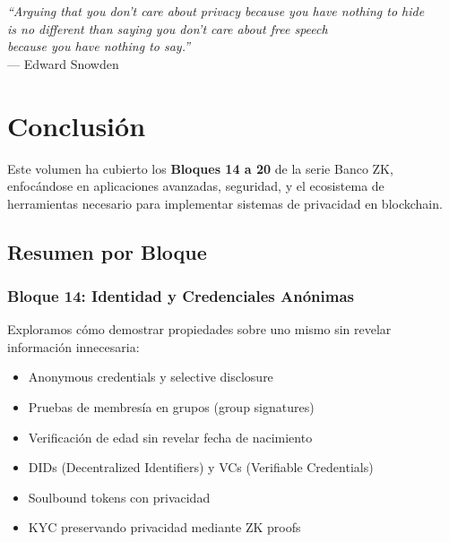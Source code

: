 \documentclass[11pt,a4paper,twoside]{book}
\theoremstyle{definition}
\theoremstyle{remark}
\renewcommand{\cleardoublepage}{\clearpage}
\begin{document}
\begin{keyidea}
\vspace{0.5cm}
\begin{center}
\textit{``Arguing that you don't care about privacy because you have nothing to hide}\\
\textit{is no different than saying you don't care about free speech}\\
\textit{because you have nothing to say.''}\\
--- Edward Snowden
\end{center}
\end{keyidea}

\cleardoublepage

\chapter*{Conclusión}

Este volumen ha cubierto los \textbf{Bloques 14 a 20} de la serie Banco ZK, enfocándose en aplicaciones avanzadas, seguridad, y el ecosistema de herramientas necesario para implementar sistemas de privacidad en blockchain.

\section*{Resumen por Bloque}

\subsection*{Bloque 14: Identidad y Credenciales Anónimas}
Exploramos cómo demostrar propiedades sobre uno mismo sin revelar información innecesaria:
\begin{itemize}
    \item Anonymous credentials y selective disclosure
    \item Pruebas de membresía en grupos (group signatures)
    \item Verificación de edad sin revelar fecha de nacimiento
    \item DIDs (Decentralized Identifiers) y VCs (Verifiable Credentials)
    \item Soulbound tokens con privacidad
    \item KYC preservando privacidad mediante ZK proofs
\end{itemize}
\end{document}
